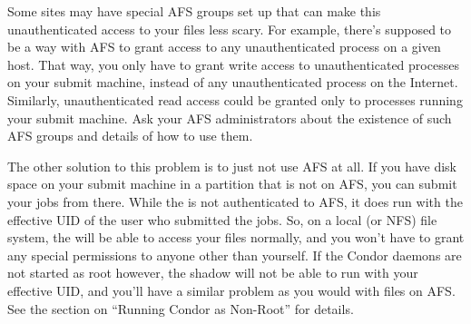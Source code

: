 Some sites may have special AFS groups set up that can make this
unauthenticated access to your files less scary.  For example, there's
supposed to be a way with AFS to grant access to any unauthenticated
process on a given host.  That way, you only have to grant write
access to unauthenticated processes on your submit machine, instead of
any unauthenticated process on the Internet.  Similarly,
unauthenticated read access could be granted only to processes running
your submit machine.  Ask your AFS administrators about the existence
of such AFS groups and details of how to use them.

The other solution to this problem is to just not use AFS at all.  If
you have disk space on your submit machine in a partition that is not
on AFS, you can submit your jobs from there.  While the 
is not authenticated to AFS, it does run with the effective UID of the
user who submitted the jobs.  So, on a local (or NFS) file system, the
 will be able to access your files normally, and you
won't have to grant any special permissions to anyone other than
yourself.  If the Condor daemons are not started as root however, the
shadow will not be able to run with your effective UID, and you'll
have a similar problem as you would with files on AFS.  See the
section on ``Running Condor as Non-Root'' for details.
    

